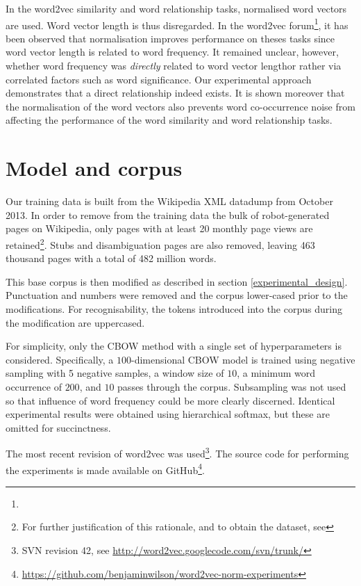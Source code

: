 \documentclass{article} %
\begin{document}
In the word2vec similarity and word relationship tasks, normalised word vectors are used.
Word vector length is thus disregarded.
In the word2vec forum\footnote{\googlegroup}, it has been observed that normalisation improves performance on theses tasks since word vector length is related to word frequency.
It remained unclear, however, whether word frequency was \textit{directly} related to word vector lengthor rather via correlated factors such as word significance.
Our experimental approach demonstrates that a direct relationship indeed exists.
It is shown moreover that the normalisation of the word vectors also prevents word co-occurrence noise from affecting the performance of the word similarity and word relationship tasks.

\section{Model and corpus}
Our training data is built from the Wikipedia XML datadump from October 2013.
In order to remove from the training data the bulk of robot-generated pages on Wikipedia, only pages with at least 20 monthly page views are retained\footnote{For further justification of this rationale, and to obtain the dataset, see \blogpost}.
Stubs and disambiguation pages are also removed, leaving 463 thousand pages with a total of 482 million words.

This base corpus is then modified as described in section \ref{experimental_design}.
Punctuation and numbers were removed and the corpus lower-cased prior to the modifications.
For recognisability, the tokens introduced into the corpus during the modification are uppercased.

For simplicity, only the CBOW method with a single set of hyperparameters is considered.
Specifically, a $100$-dimensional CBOW model is trained using negative sampling with 5 negative samples, a window size of $10$, a minimum word occurrence of $200$, and $10$ passes through the corpus.
Subsampling was not used so that influence of word frequency could be more clearly discerned.
Identical experimental results were obtained using hierarchical softmax, but these are omitted for succinctness.

The most recent revision of word2vec was used\footnote{SVN revision 42, see \url{http://word2vec.googlecode.com/svn/trunk/}}.
The source code for performing the experiments is made available on GitHub\footnote{\url{https://github.com/benjaminwilson/word2vec-norm-experiments}}.
\end{document}
